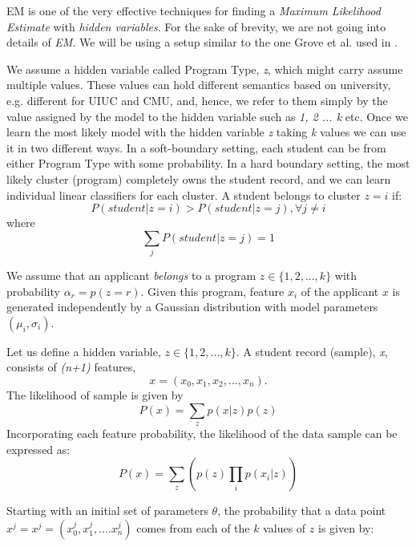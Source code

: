 \documentclass{sig-alternate-05-2015}
\begin{document}
EM is one of the very effective techniques for finding a \textit{Maximum Likelihood Estimate} with \textit{hidden variables}. For the sake of brevity, we are not going into details of \textit{EM}. We will be using a setup similar to the one Grove et al. used in \cite{GroveRoth}.

We assume a hidden variable called Program Type, \textit{z}, which might carry assume multiple values. These values can hold different semantics based on university, e.g. different for UIUC and CMU, and, hence, we refer to them simply by the value assigned by the model to the hidden variable such as \textit{1, 2 ... k} etc. Once we learn the most likely model with the hidden variable \textit{z} taking \textit{k} values we can use it in two different ways.  In a soft-boundary setting, each student can be from either Program Type with some probability. In a hard boundary setting, the most likely cluster (program) completely owns the student record, and we can learn individual linear classifiers for each cluster. A student belongs to cluster $z=i$ if:
\begin{equation}P(student | z=i) > P(student | z=j), \forall {j\neq i}\end{equation}
where
\begin{equation}
\sum_j P(student | z=j) = 1
\end{equation}

We assume that an applicant \textit{belongs} to a program $ z \in \{1,2,...,k\} $ with probability $\alpha_r = p(z=r)$. Given this program, feature $x_i$ of the applicant $x$ is generated independently by a Gaussian distribution with model parameters $(\mu_i, \sigma_i)$.

Let us define a hidden variable, $ z \in \{1,2,...,k\} $. A student record (sample), \textit{x}, consists of \textit{(n+1)} features,
$$ x = (x_0, x_1, x_2, ..., x_n). $$
The likelihood of sample is given by
\begin{equation}
P(x) = \sum_z p(x | z) p(z)
\end{equation}
Incorporating each feature probability, the likelihood of the data sample can be expressed as:
\begin{equation}
P(x) = \sum_z \left( p(z) \prod_i p(x_i | z) \right)
\end{equation}

Starting with an initial set of parameters $\theta$, the probability that a data point $x^j = x^j = (x_0^j,x_1^j, ....x_n^j)$ comes from each of the $k$ values of $z$ is given by:
\end{document}
